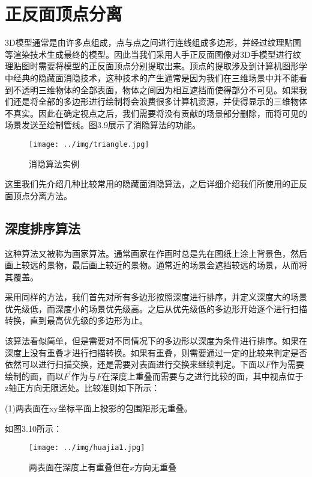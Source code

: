 \section{正反面顶点分离}
3D模型通常是由许多点组成，点与点之间进行连线组成多边形，并经过纹理贴图等渲染技术生成最终的模型。因此当我们采用人手正反面图像对3D手模型进行纹理贴图时需要将模型的正反面顶点分别提取出来。顶点的提取涉及到计算机图形学中经典的隐藏面消隐技术，这种技术的产生通常是因为我们在三维场景中并不能看到不透明三维物体的全部表面，物体之间因为相互遮挡而使得部分不可见。如果我们还是将全部的多边形进行绘制将会浪费很多计算机资源，并使得显示的三维物体不真实。因此在确定视点之后，我们需要将没有贡献的场景部分删除，而将可见的场景发送至绘制管线。图3.9展示了消隐算法的功能。

\begin{figure}[htb]
\centering
\texttt{[image: ../img/triangle.jpg]}
\caption{消隐算法实例}
\label{fig：graph}
\end{figure} 

这里我们先介绍几种比较常用的隐藏面消隐算法，之后详细介绍我们所使用的正反面顶点分离方法。


\subsection{深度排序算法}

这种算法又被称为画家算法。通常画家在作画时总是先在图纸上涂上背景色，然后画上较远的景物，最后画上较近的景物。通常近的场景会遮挡较远的场景，从而将其覆盖。

采用同样的方法，我们首先对所有多边形按照深度进行排序，并定义深度大的场景优先级低，而深度小的场景优先级高。之后从优先级低的多边形开始逐个进行扫描转换，直到最高优先级的多边形为止。

该算法看似简单，但是需要对不同情况下的多边形以深度为条件进行排序。如果在深度上没有重叠才进行扫描转换。如果有重叠，则需要通过一定的比较来判定是否依然可以进行扫描交换，还是需要对表面进行交换来继续判定。下面以$F$作为需要绘制的面，而以$F^{'}$作为与$F$在深度上重叠而需要与之进行比较的面，其中视点位于z轴正方向无限远处。比较准则如下所示\cite{Donald10}：

(1)两表面在xy坐标平面上投影的包围矩形无重叠。

如图3.10所示：
\begin{figure}[htb]
\centering
\texttt{[image: ../img/huajia1.jpg]}
\caption{两表面在深度上有重叠但在$x$方向无重叠}
\label{fig：graph}
\end{figure} 

